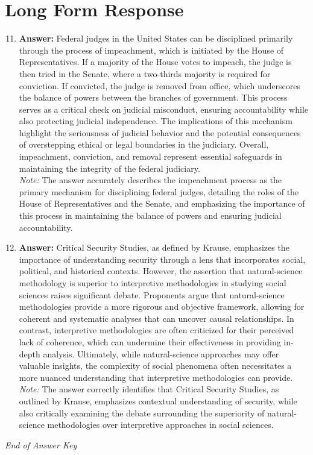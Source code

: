 \documentclass[12pt]{article}
\begin{document}
\section*{Long Form Response}
\begin{enumerate}[label=\arabic*.]
\setcounter{enumi}{10}
\item \textbf{Answer:} Federal judges in the United States can be disciplined primarily through the process of impeachment, which is initiated by the House of Representatives. If a majority of the House votes to impeach, the judge is then tried in the Senate, where a two-thirds majority is required for conviction. If convicted, the judge is removed from office, which underscores the balance of powers between the branches of government. This process serves as a critical check on judicial misconduct, ensuring accountability while also protecting judicial independence. The implications of this mechanism highlight the seriousness of judicial behavior and the potential consequences of overstepping ethical or legal boundaries in the judiciary. Overall, impeachment, conviction, and removal represent essential safeguards in maintaining the integrity of the federal judiciary.
\\ \textit{Note:} The answer accurately describes the impeachment process as the primary mechanism for disciplining federal judges, detailing the roles of the House of Representatives and the Senate, and emphasizing the importance of this process in maintaining the balance of powers and ensuring judicial accountability.
\item \textbf{Answer:} Critical Security Studies, as defined by Krause, emphasizes the importance of understanding security through a lens that incorporates social, political, and historical contexts. However, the assertion that natural-science methodology is superior to interpretive methodologies in studying social sciences raises significant debate. Proponents argue that natural-science methodologies provide a more rigorous and objective framework, allowing for coherent and systematic analyses that can uncover causal relationships. In contrast, interpretive methodologies are often criticized for their perceived lack of coherence, which can undermine their effectiveness in providing in-depth analysis. Ultimately, while natural-science approaches may offer valuable insights, the complexity of social phenomena often necessitates a more nuanced understanding that interpretive methodologies can provide.
\\ \textit{Note:} The answer correctly identifies that Critical Security Studies, as outlined by Krause, emphasizes contextual understanding of security, while also critically examining the debate surrounding the superiority of natural-science methodologies over interpretive approaches in social sciences.
\end{enumerate}

\vfill
\noindent\textit{End of Answer Key}
\end{document}
